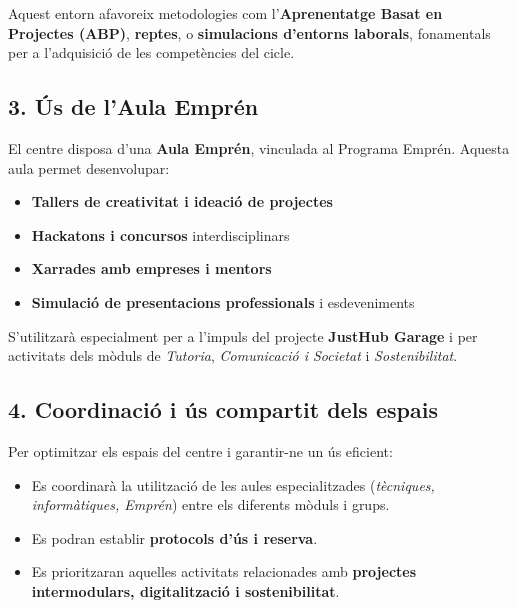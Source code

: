 \documentclass[
  paper=a4,
  ,captions=tableheading
]{scrartcl}
\providecommand{\tightlist}{%
  \setlength{\itemsep}{0pt}\setlength{\parskip}{0pt}}
\begin{document}
Aquest entorn afavoreix metodologies com l'\textbf{Aprenentatge Basat en
Projectes (ABP)}, \textbf{reptes}, o \textbf{simulacions d'entorns
laborals}, fonamentals per a l'adquisició de les competències del cicle.

\hypertarget{uxfas-de-laula-empruxe9n}{%
\subsection{3. Ús de l'Aula Emprén}\label{uxfas-de-laula-empruxe9n}}

El centre disposa d'una \textbf{Aula Emprén}, vinculada al Programa
Emprén. Aquesta aula permet desenvolupar:

\begin{itemize}
\tightlist
\item
  \textbf{Tallers de creativitat i ideació de projectes}
\item
  \textbf{Hackatons i concursos} interdisciplinars
\item
  \textbf{Xarrades amb empreses i mentors}
\item
  \textbf{Simulació de presentacions professionals} i esdeveniments
\end{itemize}

S'utilitzarà especialment per a l'impuls del projecte \textbf{JustHub
Garage} i per activitats dels mòduls de \emph{Tutoria},
\emph{Comunicació i Societat} i \emph{Sostenibilitat}.

\hypertarget{coordinaciuxf3-i-uxfas-compartit-dels-espais}{%
\subsection{4. Coordinació i ús compartit dels
espais}\label{coordinaciuxf3-i-uxfas-compartit-dels-espais}}

Per optimitzar els espais del centre i garantir-ne un ús eficient:

\begin{itemize}
\tightlist
\item
  Es coordinarà la utilització de les aules especialitzades
  (\emph{tècniques, informàtiques, Emprén}) entre els diferents mòduls i
  grups.
\item
  Es podran establir \textbf{protocols d'ús i reserva}.
\item
  Es prioritzaran aquelles activitats relacionades amb \textbf{projectes
  intermodulars, digitalització i sostenibilitat}.
\end{itemize}
\end{document}
